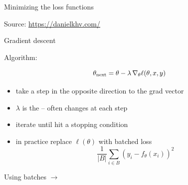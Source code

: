 \begin{frame}

    Minimizing the loss functions  
    
    \begin{figure}
       \begin{center}
       \end{center}
    \end{figure}

    Source: \url{https://danielkhv.com/}

\end{frame}


\begin{frame}{Gradient descent}

    Algorithm:
    
    \begin{equation*}
        \theta_{\rm{next}} = \theta - \lambda \, \nabla_\theta \ell(\theta, x, y)
    \end{equation*}

    \begin{itemize}
        \item take a step in the opposite direction to the grad vector
        \vspace{0.5em}
        \item $\lambda$ is the  -- often changes at each step
        \vspace{0.5em}
        \item iterate until hit a stopping condition
        \vspace{0.5em}
        \item in practice replace $\ell(\theta)$ with batched loss
            \begin{equation*}
                \frac{1}{|B|}\sum_{i \in B} (y_i - f_\theta(x_i))^2
            \end{equation*}
    \end{itemize}

    Using batches $\to$ 

\end{frame}


